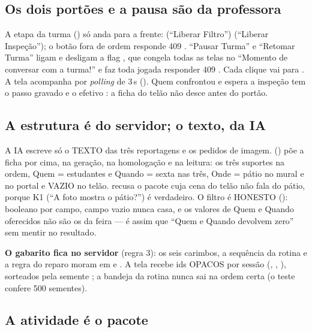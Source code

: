 \subsection{Os dois portões e a pausa são da professora}

A etapa da turma () só anda para a frente:
 \seta{}  (\enquote{Liberar Filtro}) \seta{}
 (\enquote{Liberar Inspeção}); o botão fora de ordem responde 409
. \enquote{Pausar Turma} e \enquote{Retomar
Turma} ligam e desligam a flag , que congela todas as telas no
\enquote{Momento de conversar com a turma!} e faz toda jogada responder 409
. Cada clique vai para . A
tela acompanha por \emph{polling} de 3\,s ().
Quem confrontou e espera a inspeção tem o passo gravado  e o efetivo
: a ficha do telão não desce antes do portão.

\subsection{A estrutura é do servidor; o texto, da IA}

A IA escreve só o TEXTO das três reportagens e os pedidos de imagem.
 () põe a ficha por cima, na geração,
na homologação e na leitura: os três suportes na ordem, Quem = estudantes e
Quando = sexta nas três, Onde = pátio no mural e no portal e VAZIO no telão.
 recusa o pacote cuja cena do telão não fala do pátio,
porque K1 (\enquote{A foto mostra o pátio?}) é verdadeiro. O filtro é
HONESTO (): booleano por campo, campo vazio nunca
casa, e os valores de Quem e Quando oferecidos não são os da feira --- é assim
que \enquote{Quem e Quando devolvem zero} sem mentir no resultado.

\begin{regra}
\textbf{O gabarito fica no servidor} (regra 3): os seis carimbos, a sequência
da rotina e a regra do reparo moram em  e . A
tela recebe ids OPACOS por sessão (, , ), sorteados
pela semente ; a bandeja da rotina nunca sai na ordem certa
(o teste confere 500 sementes).
\end{regra}

\subsection{A atividade é o pacote}

